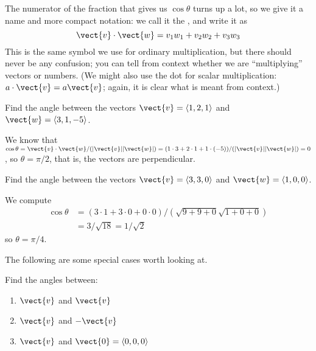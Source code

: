 The numerator of the fraction that gives us $\cos\theta$ turns up a
lot, so we give it a name and more compact notation: we call it
the , and write it as
\[
\vect{v}\cdot\vect{w} = v_1w_1+v_2w_2+v_3w_3
\]
This is the same symbol we use for ordinary multiplication, but there
should never be any confusion; you can tell from context whether we
are ``multiplying'' vectors or numbers. (We might also use the dot for
scalar multiplication: $a\cdot\vect{v}=a\vect{v}$; again, it is clear
what is meant from context.)

\begin{example}{}{}
Find the angle between the vectors $\vect{v}=\langle 1,2,1\rangle$ and
$\vect{w}=\langle 3,1,-5\rangle$.
\end{example}

\begin{solution}
We know that
$\cos\theta=\vect{v}\cdot\vect{w}/(|\vect{v}||\vect{w}|)=
(1\cdot3 + 2\cdot1 + 1\cdot(-5))/(|\vect{v}||\vect{w}|)=0$, so
$\theta=\pi/2$, that is, the vectors are perpendicular.
\end{solution}

\begin{example}{}{}
Find the angle between the vectors $\vect{v}=\langle 3,3,0\rangle$ and
$\vect{w}=\langle 1,0,0\rangle$.
\end{example}

\begin{solution}
We compute
\begin{align*}
\cos\theta &= (3\cdot1 + 3\cdot0 + 0\cdot0)/(\sqrt{9+9+0}\sqrt{1+0+0})	\\
&= 3/\sqrt{18} = 1/\sqrt2
\end{align*}
so $\theta=\pi/4$.
\end{solution}

The following are some special cases worth looking at. 

\begin{example}{}{}
Find the angles between:
\begin{enumerate}
\item $\vect{v}$ and $\vect{v}$
\item $\vect{v}$ and $-\vect{v}$
\item $\vect{v}$ and $\vect{0}=\langle 0,0,0\rangle$
\end{enumerate}
\end{example}

